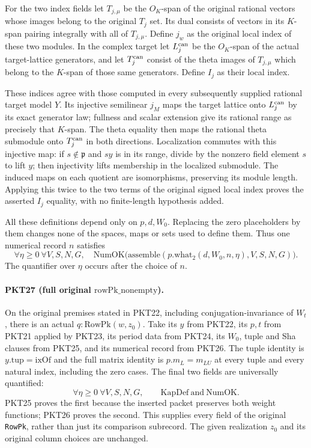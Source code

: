 For the two index fields let $T_{j,\mu}$ be the $O_K$-span of the original
rational vectors whose images belong to the original $T_j$ set.  Its dual
consists of vectors in its $K$-span pairing integrally with all of
$T_{j,\mu}$.  Define $j_w$ as the original local index of these two
modules.  In the complex target let $L_j^{\rm can}$ be the $O_K$-span of
the actual target-lattice generators, and let $T_j^{\rm can}$ consist of
the theta images of $T_{j,\mu}$ which belong to the $K$-span of those
same generators.  Define $I_j$ as their local index.

These indices agree with those computed in every subsequently supplied
rational target model $Y$.  Its injective semilinear $j_M$ maps the target
lattice onto $L_j^{\rm can}$ by its exact generator law; fullness and
scalar extension give its rational range as precisely that $K$-span.
The theta equality then maps the rational theta submodule onto
$T_j^{\rm can}$ in both directions.  Localization commutes with this
injective map: if $s\notin\mathfrak p$ and $sy$ is in its range, divide
by the nonzero field element $s$ to lift $y$; then injectivity lifts
membership in the localized submodule.  The induced maps on each quotient
are isomorphisms, preserving its module length.  Applying this twice to
the two terms of the original signed local index proves the asserted
$I_j$ equality, with no finite-length hypothesis added.

All these definitions depend only on $p,d,W_0$.  Replacing the zero
placeholders by them changes none of the spaces, maps or sets used to
define them.  Thus one numerical record $n$ satisfies
\[
 \forall\eta\ge0\ \forall V,S,N,G,
 \quad \mathrm{NumOK}\bigl(\mathrm{assemble}
             (p.\mathrm{what}_2(d,W_0,n,\eta),V,S,N,G)\bigr).
 \tag{PKT.28}
\]
The quantifier over $\eta$ occurs after the choice of $n$.

\paragraph{PKT27 (full original $\mathrm{rowPk\_nonempty}$).}\label{claim:PKT27}
On the original premises stated in PKT22, including conjugation-invariance
of $W_t$, there is an actual $q:\mathrm{RowPk}(w,z_0)$.  Take its $y$
from PKT22, its $p,t$ from PKT21 applied by PKT23, its period data from
PKT24, its $W_0$, tuple and Sha clauses from PKT25, and its numerical
record from PKT26.  The tuple identity is
$y.\mathrm{tup}=\mathrm{ixOf}$ and the full matrix identity is
$p.m_L=m_{LU}$ at every tuple and every natural index, including the
zero cases.  The final two fields are universally quantified:
\[
 \forall\eta\ge0\ \forall V,S,N,G,
   \qquad \mathrm{KapDef}\ \text{and}\ \mathrm{NumOK}.
 \tag{PKT.29}
\]
PKT25 proves the first because the inserted packet preserves both weight
functions; PKT26 proves the second.  This supplies every field of the
original \texttt{RowPk}, rather than just its comparison subrecord.
The given realization $z_0$ and its original column choices are unchanged.

